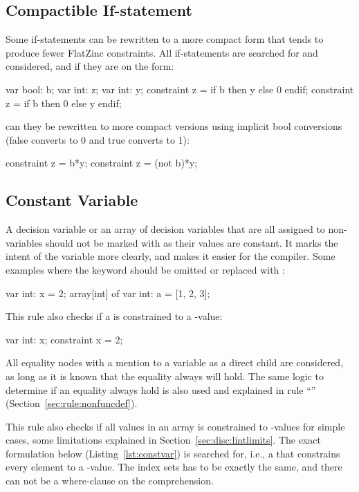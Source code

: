 \documentclass[a4paper,12pt]{article}
\newcommand{\ruleref}[1]{``\nameref{sec:rule:#1}'' (Section~\ref{sec:rule:#1})}
\begin{document}
\subsection{Compactible If-statement}\label{sec:rule:compactif}
Some if-statements can be rewritten to a more compact form that tends to produce fewer
FlatZinc constraints. All if-statements are searched for and considered, and if they are on
the form:
\begin{mznnobreak}
var bool: b; var int: z; var int: y;
constraint z = if b then y else 0 endif;
constraint z = if b then 0 else y endif;
\end{mznnobreak}

can they be rewritten to more compact versions using implicit bool conversions (false converts
to 0 and true converts to 1):

\begin{mznnobreak}
constraint z = b*y;
constraint z = (not b)*y;
\end{mznnobreak}

\subsection{Constant Variable}\label{sec:rule:constvar}
A decision variable or an array of decision variables that are all assigned to non-variables should not be
marked with  as their values are constant. It marks the intent of the variable more
clearly, and makes it easier for the compiler. Some examples where the keyword 
should be omitted or replaced with :

\begin{mznnobreak}
var int: x = 2;
array[int] of var int: a = [1, 2, 3];
\end{mznnobreak}

This rule also checks if a  is constrained to a -value:

\begin{mznnobreak}
var int: x;
constraint x = 2;
\end{mznnobreak}

All equality nodes with a mention to a variable as a direct child are considered, as long
as it is known that the equality always will hold. The same logic to determine if an
equality always hold is also used and explained in rule \ruleref{nonfuncdef}.

This rule also checks if all values in an array is constrained to -values for
simple cases, some limitations explained in Section~\ref{sec:disc:lintlimits}. The exact
formulation below (Listing~\ref{lst:constvar}) is searched for, i.e., a  that constrains every element to a
-value. The index sets has to be exactly the same, and there can not be a
where-clause on the comprehension.
\end{document}
